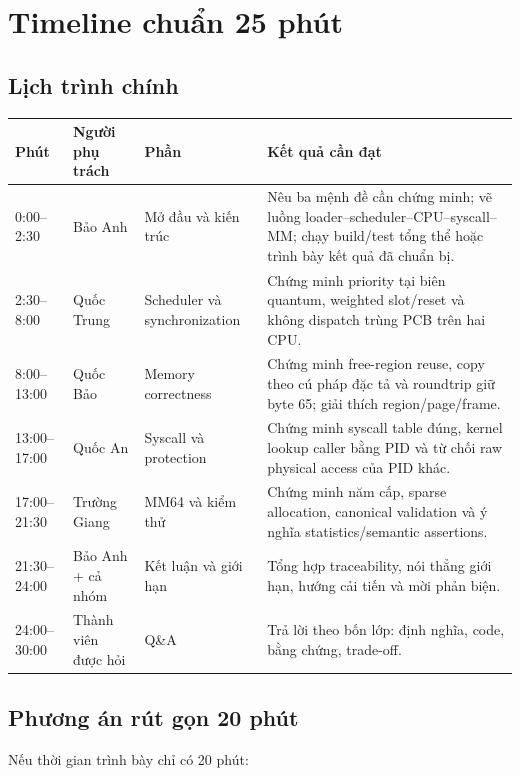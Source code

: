 \documentclass[12pt,a4paper]{article}
\begin{document}
\section{Timeline chuẩn 25 phút}

\subsection{Lịch trình chính}

\begin{small}
\begin{longtable}{|p{2.0cm}|p{3.1cm}|p{3.0cm}|p{6.5cm}|}
\hline
\textbf{Phút} & \textbf{Người phụ trách} & \textbf{Phần} &
\textbf{Kết quả cần đạt}\\ \hline
0:00--2:30 & Bảo Anh & Mở đầu và kiến trúc &
Nêu ba mệnh đề cần chứng minh; vẽ luồng loader--scheduler--CPU--syscall--MM;
chạy build/test tổng thể hoặc trình bày kết quả đã chuẩn bị.\\ \hline
2:30--8:00 & Quốc Trung & Scheduler và synchronization &
Chứng minh priority tại biên quantum, weighted slot/reset và không dispatch
trùng PCB trên hai CPU.\\ \hline
8:00--13:00 & Quốc Bảo & Memory correctness &
Chứng minh free-region reuse, copy theo cú pháp đặc tả và roundtrip giữ byte
65; giải thích region/page/frame.\\ \hline
13:00--17:00 & Quốc An & Syscall và protection &
Chứng minh syscall table đúng, kernel lookup caller bằng PID và từ chối raw
physical access của PID khác.\\ \hline
17:00--21:30 & Trường Giang & MM64 và kiểm thử &
Chứng minh năm cấp, sparse allocation, canonical validation và ý nghĩa
statistics/semantic assertions.\\ \hline
21:30--24:00 & Bảo Anh + cả nhóm & Kết luận và giới hạn &
Tổng hợp traceability, nói thẳng giới hạn, hướng cải tiến và mời phản biện.\\
\hline
24:00--30:00 & Thành viên được hỏi & Q\&A &
Trả lời theo bốn lớp: định nghĩa, code, bằng chứng, trade-off.\\ \hline
\end{longtable}
\end{small}

\subsection{Phương án rút gọn 20 phút}

Nếu thời gian trình bày chỉ có 20 phút:
\end{document}
